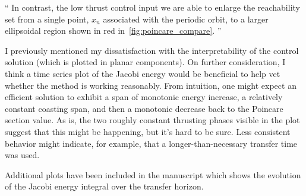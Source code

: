 \documentclass[11pt]{article}
\newenvironment{correction}{\begin{list}{}{\setlength{\leftmargin}{1cm}\setlength{\rightmargin}{1cm}}\vspace{\parsep}\item[]``}{''\end{list}}
\begin{document}
\begin{itemize}
        \begin{correction}
            In contrast, the low thrust control input we are able to enlarge the reachability set from a single point, \( x_n\) associated with the periodic orbit, to a larger ellipsoidal region shown in red in~\cref{fig:poincare_compare}.
        \end{correction}

    \item
        \begin{itshape}
            I previously mentioned my dissatisfaction with the interpretability of the control solution (which is plotted in planar components).  On further consideration, I think a time series plot of the Jacobi energy would be beneficial to help vet whether the method is working reasonably.  From intuition, one might expect an efficient solution to exhibit a span of monotonic energy increase, a relatively constant coasting span, and then a monotonic decrease back to the Poincare section value.  As is, the two roughly constant thrusting phases visible in the plot suggest that this might be happening, but it's hard to be sure.  Less consistent behavior might indicate, for example, that a longer-than-necessary transfer time was used.  
        \end{itshape}
        
        Additional plots have been included in the manuscript which shows the evolution of the Jacobi energy integral over the transfer horizon.
        

\end{itemize}
\end{document}
